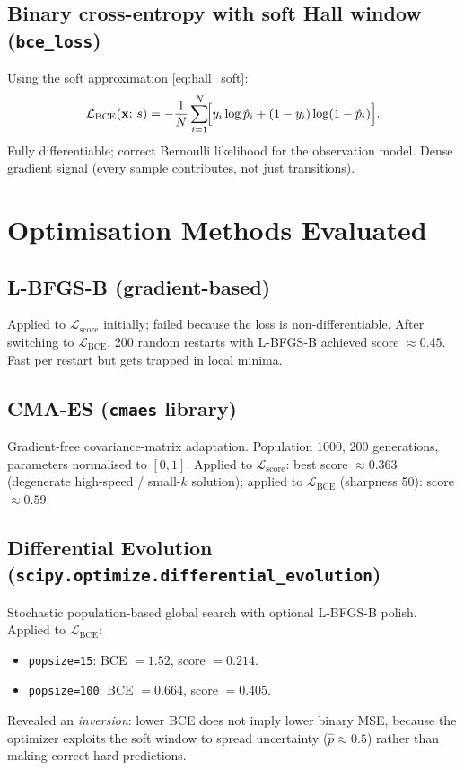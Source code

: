 \documentclass[11pt,a4paper]{article}
\begin{document}
\subsection{Binary cross-entropy with soft Hall window (\texttt{bce\_loss})}
Using the soft approximation \eqref{eq:hall_soft}:
\begin{equation}\label{eq:bce}
  \mathcal{L}_{\text{BCE}}(\mathbf{x};\,s)
  = -\frac{1}{N}\sum_{i=1}^{N}\!
    \Bigl[y_i\log\hat{p}_i + (1-y_i)\log(1-\hat{p}_i)\Bigr].
\end{equation}
Fully differentiable; correct Bernoulli likelihood for the observation model.
Dense gradient signal (every sample contributes, not just transitions).

\section{Optimisation Methods Evaluated}

\subsection{L-BFGS-B (gradient-based)}
Applied to $\mathcal{L}_{\text{score}}$ initially; failed because the loss is
non-differentiable.  After switching to $\mathcal{L}_{\text{BCE}}$, 200
random restarts with L-BFGS-B achieved score $\approx 0.45$.  Fast per
restart but gets trapped in local minima.

\subsection{CMA-ES (\texttt{cmaes} library)}
Gradient-free covariance-matrix adaptation.  Population 1000, 200
generations, parameters normalised to $[0,1]$.  Applied to
$\mathcal{L}_{\text{score}}$: best score $\approx 0.363$ (degenerate
high-speed / small-$k$ solution); applied to $\mathcal{L}_{\text{BCE}}$
(sharpness 50): score $\approx 0.59$.

\subsection{Differential Evolution (\texttt{scipy.optimize.differential\_evolution})}
Stochastic population-based global search with optional L-BFGS-B polish.
Applied to $\mathcal{L}_{\text{BCE}}$:
\begin{itemize}
  \item \texttt{popsize=15}: BCE $=1.52$, score $=0.214$.
  \item \texttt{popsize=100}: BCE $=0.664$, score $=0.405$.
\end{itemize}
Revealed an \emph{inversion}: lower BCE does not imply lower binary MSE,
because the optimizer exploits the soft window to spread uncertainty
($\hat{p}\approx 0.5$) rather than making correct hard predictions.
\end{document}
